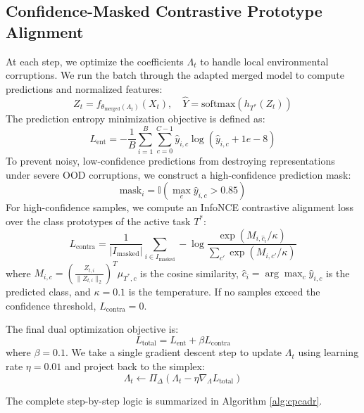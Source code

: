 \documentclass{article}
\theoremstyle{plain}
\theoremstyle{definition}
\theoremstyle{remark}
\begin{document}
\subsection{Confidence-Masked Contrastive Prototype Alignment}
At each step, we optimize the coefficients $\Lambda_t$ to handle local environmental corruptions. We run the batch through the adapted merged model to compute predictions and normalized features:
\begin{equation}
    Z_t = f_{\theta_{\text{merged}}(\Lambda_t)}(X_t), \quad \hat{Y} = \text{softmax}(h_{T^*}(Z_t))
\end{equation}
The prediction entropy minimization objective is defined as:
\begin{equation}
    L_{\text{ent}} = -\frac{1}{B} \sum_{i=1}^B \sum_{c=0}^{C-1} \hat{y}_{i,c} \log(\hat{y}_{i,c} + 1e-8)
\end{equation}
To prevent noisy, low-confidence predictions from destroying representations under severe OOD corruptions, we construct a high-confidence prediction mask:
\begin{equation}
    \text{mask}_i = \mathbb{I}\left( \max_c \hat{y}_{i,c} > 0.85 \right)
\end{equation}
For high-confidence samples, we compute an InfoNCE contrastive alignment loss over the class prototypes of the active task $T^*$:
\begin{equation}
    L_{\text{contra}} = \frac{1}{|I_{\text{masked}}|} \sum_{i \in I_{\text{masked}}} -\log \frac{\exp(M_{i, \hat{c}_i} / \kappa)}{\sum_{c'} \exp(M_{i, c'} / \kappa)}
\end{equation}
where $M_{i,c} = \left(\frac{Z_{t,i}}{\|Z_{t,i}\|_2}\right)^T \mu_{T^*,c}$ is the cosine similarity, $\hat{c}_i = \arg\max_c \hat{y}_{i,c}$ is the predicted class, and $\kappa = 0.1$ is the temperature. If no samples exceed the confidence threshold, $L_{\text{contra}} = 0$.

The final dual optimization objective is:
\begin{equation}
    L_{\text{total}} = L_{\text{ent}} + \beta L_{\text{contra}}
\end{equation}
where $\beta = 0.1$. We take a single gradient descent step to update $\Lambda_t$ using learning rate $\eta = 0.01$ and project back to the simplex:
\begin{equation}
    \Lambda_t \leftarrow \Pi_\Delta (\Lambda_t - \eta \nabla_\Lambda L_{\text{total}})
\end{equation}

The complete step-by-step logic is summarized in Algorithm \ref{alg:cpcadr}.
\end{document}
